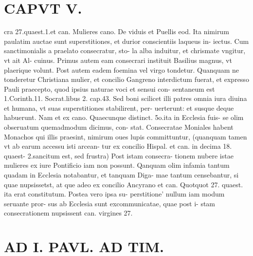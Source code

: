 \documentclass{article}
\begin{document}
\begin{pages}
\section*{CAPVT V. }
\marginpar{[ p.295 ]}\pstart cra 27.quaest.1.et can. Mulieres cano. De viduis et Puellis eod. Ita nimirum paulatim auctae sunt superstitiones, et durior conscientiis laqueus in- iectus. Cum sanctimonialis a praelato consecratur, sto- la alba induitur, et chrismate vngitur, vt ait Al- cuinus. Primus autem eam consecrari instituit Basilius magnus, vt plaerique volunt. Post autem eadem foemina vel virgo tondetur. Quanquam ne tonderetur Christiana mulier, et concilio Gangreno interdictum fuerat, et expresso Pauli praecepto, quod ipsius naturae voci et sensui con- sentaneum est 1.Corinth.11. Socrat.libus 2. cap.43. Sed boni scilicet illi patres omnia iura diuina et humana, vt suas superstitiones stabilirent, per- uerterunt: et susque deque habuerunt. Nam et ex cano. Quaecunque distinct. 5o.ita in Ecclesia fuis- se olim obseruatum quemadmodum dicimus, con- stat. Consecratae Moniales habent Monachos qui illis praesint, nimirum oues lupis committuntur, (quanquam tamen vt ab earum accessu isti arcean- tur ex concilio Hispal. et can. in decima 18. quaest- 2.sancitum est, sed frustra) Post istam consecra- tionem nubere istae mulieres ex iure Pontificio iam non possunt. Qanquam olim infamia tantum quadam in Ecclesia notabantur, et tanquam Diga- mae tantum censebantur, si quae nupsissetst, at que adeo ex concilio Ancyrano et can. Quotquot 27. quaest. ita erat constitutum. Postea vero ipsa su- perstitione' nullum iam modum seruante pror- sus ab Ecclesia sunt excommunicatae, quae post i- stam consecrationem nupsissent can. virgines 27.  \pend
\section*{AD I. PAVL. AD TIM. }
\marginpar{[ p.296 ]}\pstart {}
{}

\end{pages}
\end{document}
